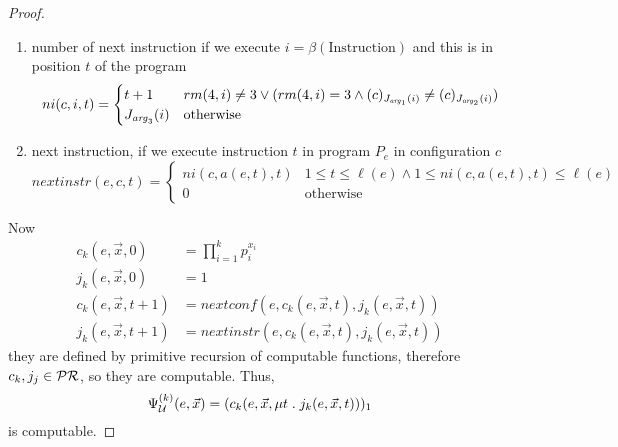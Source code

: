 \begin{theorem}
\begin{proof}
\begin{enumerate}[label=(\alph*)]
  \item number of next instruction if we execute $i=\beta(\mbox{Instruction})$ 
        and this is in position $t$ of the program
    \[
      ni(c, i, t) = \begin{cases}
        t+1 & rm(4,i) \neq 3 \vee (rm(4,i) = 3 \wedge (c)_{J_{{\mathit{arg}}_1}(i)} \neq (c)_{J_{{\mathit{arg}}_2}(i)}) \\
        J_{{\mathit{arg}}_3}(i) & \mbox{otherwise}
      \end{cases}
    \]

  \item next instruction, if we execute instruction $t$
    in program $P_e$ in configuration $c$
    \[
      nextinstr(e,c,t) = \begin{cases}
        ni(c, a(e,t), t) & 1 \leq t \leq \ell(e) \wedge 1 \leq ni(c, a(e,t), t) \leq \ell(e) \\
        0 & \mbox{otherwise}
      \end{cases}
    \]
  \end{enumerate}

 Now
 \begin{align*}
  c_k(e, \vec{x}, 0) &= \prod_{i=1}^kp_i^{x_i} \\
  j_k(e, \vec{x}, 0) &= 1 \\
  c_k(e, \vec{x}, t+1) &= nextconf (e, c_k(e, \vec{x}, t), j_k(e,\vec{x},t)) \\
  j_k(e, \vec{x}, t+1) &= nextinstr (e, c_k(e, \vec{x}, t), j_k(e,\vec{x},t))
 \end{align*}
 they are defined by primitive recursion of computable functions, therefore $c_k, j_j \in \mathcal{PR}$, so they are computable.
 Thus,
  \[
    \Psi_{\mathcal{U}}^{(k)} (e, \vec{x}) = (c_k(e, \vec{x}, \mu t \; . \; j_k(e,\vec{x},t)))_1
  \]
  is computable.
  \end{proof}
\end{theorem}

